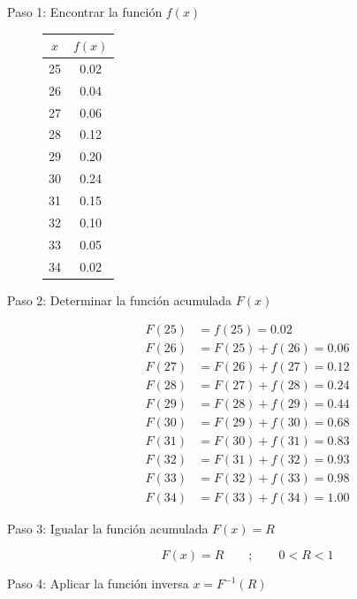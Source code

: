 \begin{description}
    \item[Paso 1: Encontrar la función $f(x)$]

    \begin{center}
    \begin{tabular}{cc}
    \toprule
    $x$ & $f(x)$ \\
    \midrule
    25 & 0.02 \\ 26 & 0.04 \\ 27 & 0.06 \\ 28 & 0.12 \\ 29 & 0.20 \\
    30 & 0.24 \\ 31 & 0.15 \\ 32 & 0.10 \\ 33 & 0.05 \\ 34 & 0.02 \\
    \bottomrule
    \end{tabular}
    \end{center}

    \item[Paso 2: Determinar la función acumulada $F(x)$]

    \begin{align*}
    F(25) &= f(25) = 0.02 \\
    F(26) &= F(25)+f(26) = 0.06 \\
    F(27) &= F(26)+f(27) = 0.12 \\
    F(28) &= F(27)+f(28) = 0.24 \\
    F(29) &= F(28)+f(29) = 0.44 \\
    F(30) &= F(29)+f(30) = 0.68 \\
    F(31) &= F(30)+f(31) = 0.83 \\
    F(32) &= F(31)+f(32) = 0.93 \\
    F(33) &= F(32)+f(33) = 0.98 \\
    F(34) &= F(33)+f(34) = 1.00
    \end{align*}

    \item[Paso 3: Igualar la función acumulada $F(x) = R$]

    $$ F(x)=R \qquad ; \qquad 0 < R < 1 $$

    \item[Paso 4: Aplicar la función inversa $x=F^{-1}(R)$]


\end{description}
